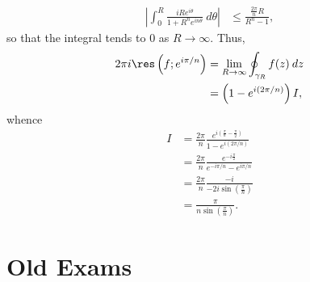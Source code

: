 \documentclass[10pt]{mypackage}
\begin{document}
\begin{example}
  \begin{align*}
    \left\vert \int_{0}^{R} \frac{iRe^{i\theta}}{1 + R^{n}e^{in\theta}}\:d\theta \right\vert &\leq \frac{\frac{2\pi}{n}R}{R^{n}-1},
  \end{align*}
  so that the integral tends to $0$ as $R\rightarrow\infty$. Thus,
  \begin{align*}
    2\pi i \res\left( f;e^{i\pi/n} \right) &= \lim_{R\rightarrow\infty} \oint_{\gamma_R}^{} f(z)\:dz\\
                                           &= \left( 1-e^{i\left( 2\pi/n \right)} \right) I,
  \end{align*}
  whence
  \begin{align*}
    I &= \frac{2\pi}{n} \frac{e^{i\left( \frac{\pi}{n}-\frac{\pi}{2} \right)}}{1-e^{i\left( 2\pi/n \right)}}\\
      &= \frac{2\pi}{n} \frac{e^{-i\frac{\pi}{2}}}{e^{-i\pi/n} - e^{i\pi/n}}\\
      &= \frac{2\pi}{n} \frac{-i}{-2i \sin\left( \frac{\pi}{n} \right)}\\
      &= \frac{\pi}{n\sin\left( \frac{\pi}{n} \right)}.
  \end{align*}
\end{example}
\section{Old Exams}%
\end{document}
